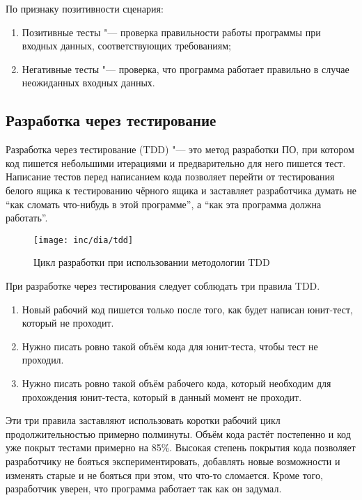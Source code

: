 По признаку позитивности сценария:
\begin{enumerate}
  \item Позитивные тесты "--- проверка правильности работы программы при входных данных, соответствующих требованиям;
  \item Негативные тесты "--- проверка, что программа работает правильно в случае неожиданных входных данных.
\end{enumerate}

\subsection{Разработка через тестирование}
\label{subsec:testing:tdd}

Разработка через тестирование (TDD) "--- это метод разработки ПО, при котором код пишется небольшими итерациями и предварительно для него пишется тест.
Написание тестов перед написанием кода позволяет перейти от тестирования белого ящика к тестированию чёрного ящика и заставляет разработчика думать не ``как сломать что-нибудь в этой программе'', а ``как эта программа должна работать''.

\begin{figure}[ht]
  \texttt{[image: inc/dia/tdd]}
  \caption{Цикл разработки при использовании методологии TDD}
  \label{fig:tdd}
\end{figure}

При разработке через тестирования следует соблюдать три правила TDD\@.
\begin{enumerate}
  \item Новый рабочий код пишется только после того, как будет написан юнит-тест, который не проходит.
  \item Нужно писать ровно такой объём кода для юнит-теста, чтобы тест не проходил.
  \item Нужно писать ровно такой объём рабочего кода, который необходим для прохождения юнит-теста, который в данный момент не проходит.
\end{enumerate}

Эти три правила заставляют использовать коротки рабочий цикл продолжительностью примерно полминуты.
Объём кода растёт постепенно и код уже покрыт тестами примерно на 85\%.
Высокая степень покрытия кода позволяет разработчику не бояться экспериментировать, добавлять новые возможности и изменять старые и не бояться при этом, что что-то сломается.
Кроме того, разработчик уверен, что программа работает так как он задумал.

